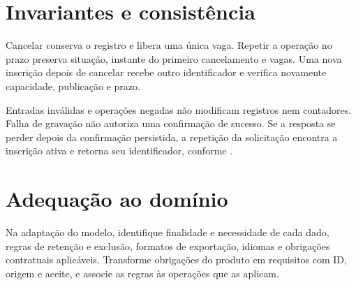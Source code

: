 \section{Invariantes e consistência}
Cancelar conserva o registro e libera uma única vaga. Repetir a operação no
prazo preserva situação, instante do primeiro cancelamento e vagas. Uma nova
inscrição depois de cancelar recebe outro identificador e verifica novamente
capacidade, publicação e prazo.

Entradas inválidas e operações negadas não modificam registros nem contadores.
Falha de gravação não autoriza uma confirmação de sucesso. Se a resposta se
perder depois da confirmação persistida, a repetição da solicitação encontra
 a inscrição ativa e retorna seu identificador, conforme .

\section{Adequação ao domínio}
Na adaptação do modelo, identifique finalidade e necessidade de cada dado,
regras de retenção e exclusão, formatos de exportação, idiomas e obrigações
contratuais aplicáveis. Transforme obrigações do produto em requisitos com ID,
origem e aceite, e associe as regras às operações que as aplicam.
